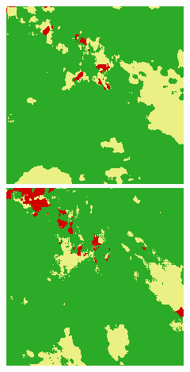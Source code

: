 \begin{figure}
    \includegraphics[width=\DensenetPredictionsImageWidth]{images/densenet/densenet-67D/436897-prediction} \hfill
    \includegraphics[width=\DensenetPredictionsImageWidth]{images/densenet/densenet-56D/436897-prediction}


\end{figure}
